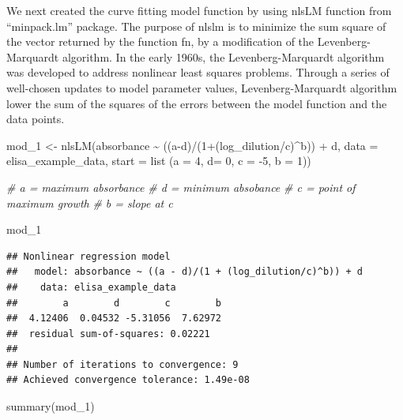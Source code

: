 \documentclass[
]{book}
\newenvironment{Shaded}{\begin{snugshade}}{\end{snugshade}}
\newcommand{\AttributeTok}[1]{\textcolor[rgb]{0.77,0.63,0.00}{#1}}
\newcommand{\CommentTok}[1]{\textcolor[rgb]{0.56,0.35,0.01}{\textit{#1}}}
\newcommand{\DecValTok}[1]{\textcolor[rgb]{0.00,0.00,0.81}{#1}}
\newcommand{\FunctionTok}[1]{\textcolor[rgb]{0.00,0.00,0.00}{#1}}
\newcommand{\NormalTok}[1]{#1}
\newcommand{\OtherTok}[1]{\textcolor[rgb]{0.56,0.35,0.01}{#1}}
\newcommand{\SpecialCharTok}[1]{\textcolor[rgb]{0.00,0.00,0.00}{#1}}
\begin{document}
We next created the curve fitting model function by using nlsLM function from ``minpack.lm'' package.
The purpose of nlslm is to minimize the sum square of the vector returned by the function fn, by a modification of the Levenberg-Marquardt algorithm. In the early 1960s, the Levenberg-Marquardt algorithm was developed to address nonlinear least squares problems. Through a series of well-chosen updates to model parameter values, Levenberg-Marquardt algorithm lower the sum of the squares of the errors between the model function and the data points.

\begin{Shaded}
\begin{Highlighting}[]
\NormalTok{mod\_1 }\OtherTok{\textless{}{-}} \FunctionTok{nlsLM}\NormalTok{(absorbance }\SpecialCharTok{\textasciitilde{}} 
\NormalTok{                 ((a}\SpecialCharTok{{-}}\NormalTok{d)}\SpecialCharTok{/}\NormalTok{(}\DecValTok{1}\SpecialCharTok{+}\NormalTok{(log\_dilution}\SpecialCharTok{/}\NormalTok{c)}\SpecialCharTok{\^{}}\NormalTok{b)) }\SpecialCharTok{+}\NormalTok{ d,}
\AttributeTok{data =}\NormalTok{ elisa\_example\_data, }
\AttributeTok{start =} \FunctionTok{list}\NormalTok{ (}\AttributeTok{a =} \DecValTok{4}\NormalTok{, }\AttributeTok{d=} \DecValTok{0}\NormalTok{, }\AttributeTok{c =} \SpecialCharTok{{-}}\DecValTok{5}\NormalTok{, }\AttributeTok{b =} \DecValTok{1}\NormalTok{))}

\CommentTok{\# a = maximum absorbance}
\CommentTok{\# d = minimum absobance}
\CommentTok{\# c = point of maximum growth }
\CommentTok{\# b = slope at c}

\NormalTok{mod\_1}
\end{Highlighting}
\end{Shaded}

\begin{verbatim}
## Nonlinear regression model
##   model: absorbance ~ ((a - d)/(1 + (log_dilution/c)^b)) + d
##    data: elisa_example_data
##        a        d        c        b 
##  4.12406  0.04532 -5.31056  7.62972 
##  residual sum-of-squares: 0.02221
## 
## Number of iterations to convergence: 9 
## Achieved convergence tolerance: 1.49e-08
\end{verbatim}

\begin{Shaded}
\begin{Highlighting}[]
\FunctionTok{summary}\NormalTok{(mod\_1)}
\end{Highlighting}
\end{Shaded}
\end{document}
